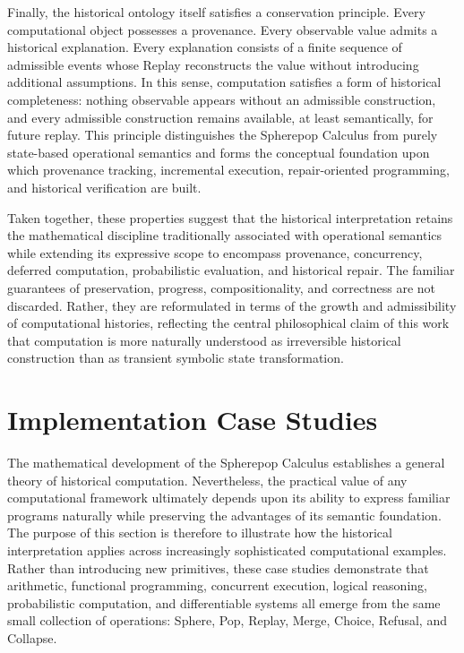 \documentclass[12pt,oneside]{article}
\theoremstyle{definition}
\theoremstyle{remark}
\begin{document}
Finally, the historical ontology itself satisfies a conservation principle.
Every computational object possesses a provenance. Every observable value
admits a historical explanation. Every explanation consists of a finite
sequence of admissible events whose Replay reconstructs the value without
introducing additional assumptions. In this sense, computation satisfies a
form of historical completeness: nothing observable appears without an
admissible construction, and every admissible construction remains available,
at least semantically, for future replay. This principle distinguishes the
Spherepop Calculus from purely state-based operational semantics and forms the
conceptual foundation upon which provenance tracking, incremental execution,
repair-oriented programming, and historical verification are built.

Taken together, these properties suggest that the historical interpretation
retains the mathematical discipline traditionally associated with operational
semantics while extending its expressive scope to encompass provenance,
concurrency, deferred computation, probabilistic evaluation, and historical
repair. The familiar guarantees of preservation, progress, compositionality,
and correctness are not discarded. Rather, they are reformulated in terms of
the growth and admissibility of computational histories, reflecting the
central philosophical claim of this work that computation is more naturally
understood as irreversible historical construction than as transient symbolic
state transformation.

\section{Implementation Case Studies}

The mathematical development of the Spherepop Calculus establishes a general
theory of historical computation. Nevertheless, the practical value of any
computational framework ultimately depends upon its ability to express familiar
programs naturally while preserving the advantages of its semantic foundation.
The purpose of this section is therefore to illustrate how the historical
interpretation applies across increasingly sophisticated computational
examples. Rather than introducing new primitives, these case studies
demonstrate that arithmetic, functional programming, concurrent execution,
logical reasoning, probabilistic computation, and differentiable systems all
emerge from the same small collection of operations: Sphere, Pop, Replay,
Merge, Choice, Refusal, and Collapse.
\end{document}
